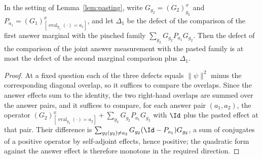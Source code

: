 \begin{lemma}
	\label{lem:pasting-pinched-reduction}
	\leanok
	In the setting of Lemma~\ref{lem:pasting}, write $G_{g_2} = (G_2)^x_{g_2}$
	and $P_{a_1} = (G_1)^x_{[\operatorname{eval}_{y_1}(\cdot) = a_1]}$, and let
	$\Delta_1$ be the defect of the comparison of the first answer marginal with
	the pinched family $\sum_{g_2} G_{g_2} P_{a_1} G_{g_2}$. Then the defect of
	the comparison of the joint answer measurement with the pasted family is at
	most the defect of the second marginal comparison plus $\Delta_1$.
\end{lemma}
\begin{proof}
	\leanok
	At a fixed question each of the three defects equals $\|\psi\|^2$ minus the
	corresponding diagonal overlap, so it suffices to compare the overlaps. Since
	the answer effects sum to the identity, the two right-hand overlaps are
	summed over the answer pairs, and it suffices to compare, for each answer
	pair $(a_1, a_2)$, the operator $(G_2)^x_{[\operatorname{eval}_{y_2}(\cdot) =
	a_2]} + \sum_{g_2} G_{g_2} P_{a_1} G_{g_2}$ with $\Id$ plus the pasted effect
	at that pair. Their difference is
	$\sum_{g_2(y_2) \neq a_2} G_{g_2} (\Id - P_{a_1}) G_{g_2}$, a sum of
	conjugates of a positive operator by self-adjoint effects, hence positive;
	the quadratic form against the answer effect is therefore monotone in the
	required direction.
\end{proof}

